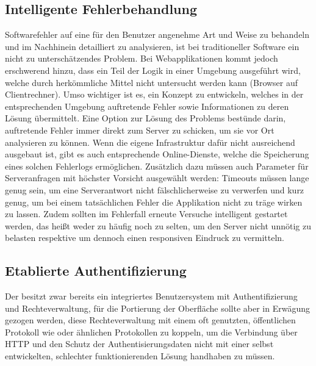 \subsection{Intelligente Fehlerbehandlung}
Softwarefehler auf eine für den Benutzer angenehme Art und Weise zu behandeln und im Nachhinein detailliert zu analysieren, ist bei traditioneller Software ein nicht zu unterschätzendes Problem. Bei Webapplikationen kommt jedoch erschwerend hinzu, dass ein Teil der Logik in einer Umgebung ausgeführt wird, welche durch herkömmliche Mittel nicht untersucht werden kann (Browser auf Clientrechner). Umso wichtiger ist es, ein Konzept zu entwickeln, welches in der entsprechenden Umgebung auftretende Fehler sowie Informationen zu deren Lösung übermittelt. Eine Option zur Lösung des Problems bestünde darin, auftretende Fehler immer direkt zum Server zu schicken, um sie vor Ort analysieren zu können. Wenn die eigene Infrastruktur dafür nicht ausreichend ausgebaut ist, gibt es auch entsprechende Online-Dienste, welche die Speicherung eines solchen Fehlerlogs ermöglichen. Zusätzlich dazu müssen auch Parameter für Serveranfragen mit höchster Vorsicht ausgewählt werden: Timeouts müssen lange genug sein, um eine Serverantwort nicht fälschlicherweise zu verwerfen und kurz genug, um bei einem tatsächlichen Fehler die Applikation nicht zu träge wirken zu lassen. Zudem sollten im Fehlerfall erneute Versuche intelligent gestartet werden, das heißt weder zu häufig noch zu selten, um den Server nicht unnötig zu belasten respektive um dennoch einen responsiven Eindruck zu vermitteln.

\subsection{Etablierte Authentifizierung}
Der  besitzt zwar bereits ein integriertes Benutzersystem mit Authentifizierung und Rechteverwaltung, für die Portierung der Oberfläche sollte aber in Erwägung gezogen werden, diese Rechteverwaltung mit einem oft genutzten, öffentlichen Protokoll wie  oder ähnlichen Protokollen zu koppeln, um die Verbindung über HTTP und den Schutz der Authentisierungsdaten nicht mit einer selbst entwickelten, schlechter funktionierenden Lösung handhaben zu müssen.

